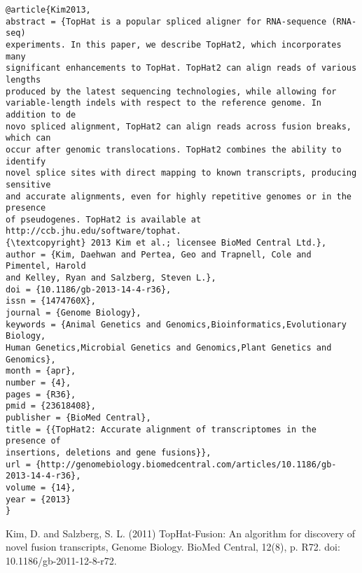 \documentclass[]{article}
\begin{document}
\begin{verbatim}
@article{Kim2013,
abstract = {TopHat is a popular spliced aligner for RNA-sequence (RNA-seq)
experiments. In this paper, we describe TopHat2, which incorporates many
significant enhancements to TopHat. TopHat2 can align reads of various lengths
produced by the latest sequencing technologies, while allowing for
variable-length indels with respect to the reference genome. In addition to de
novo spliced alignment, TopHat2 can align reads across fusion breaks, which can
occur after genomic translocations. TopHat2 combines the ability to identify
novel splice sites with direct mapping to known transcripts, producing sensitive
and accurate alignments, even for highly repetitive genomes or in the presence
of pseudogenes. TopHat2 is available at http://ccb.jhu.edu/software/tophat.
{\textcopyright} 2013 Kim et al.; licensee BioMed Central Ltd.},
author = {Kim, Daehwan and Pertea, Geo and Trapnell, Cole and Pimentel, Harold
and Kelley, Ryan and Salzberg, Steven L.},
doi = {10.1186/gb-2013-14-4-r36},
issn = {1474760X},
journal = {Genome Biology},
keywords = {Animal Genetics and Genomics,Bioinformatics,Evolutionary Biology,
Human Genetics,Microbial Genetics and Genomics,Plant Genetics and Genomics},
month = {apr},
number = {4},
pages = {R36},
pmid = {23618408},
publisher = {BioMed Central},
title = {{TopHat2: Accurate alignment of transcriptomes in the presence of
insertions, deletions and gene fusions}},
url = {http://genomebiology.biomedcentral.com/articles/10.1186/gb-2013-14-4-r36},
volume = {14},
year = {2013}
}

\end{verbatim}

Kim, D. and Salzberg, S. L. (2011) TopHat-Fusion: An algorithm for discovery of novel fusion transcripts, Genome Biology. BioMed Central, 12(8), p. R72. doi: 10.1186/gb-2011-12-8-r72.
\end{document}
